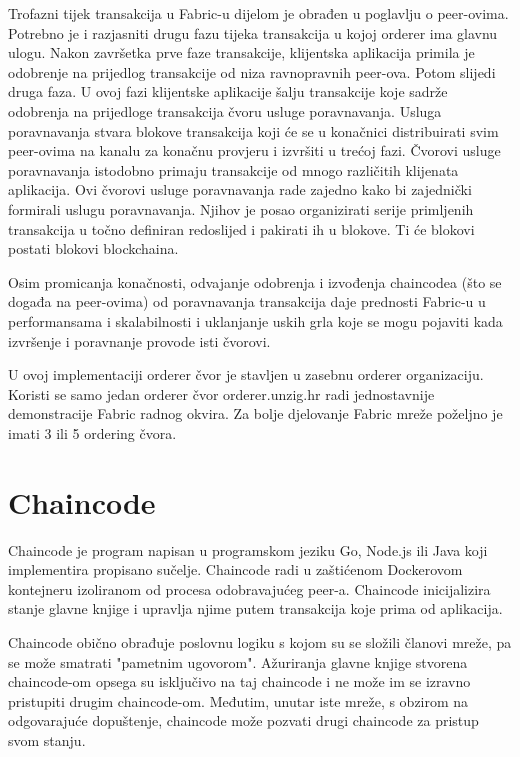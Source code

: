 \documentclass[times, utf8, diplomski]{fer}
\begin{document}
Trofazni tijek transakcija u Fabric-u dijelom je obrađen u poglavlju o peer-ovima.  Potrebno je i razjasniti drugu fazu tijeka transakcija u kojoj orderer ima glavnu ulogu.  Nakon završetka prve faze transakcije, klijentska aplikacija primila je odobrenje na prijedlog transakcije od niza ravnopravnih peer-ova. Potom slijedi druga faza. U ovoj fazi klijentske aplikacije šalju transakcije koje sadrže odobrenja na prijedloge transakcija čvoru usluge poravnavanja. Usluga poravnavanja stvara blokove transakcija koji će se u konačnici distribuirati svim peer-ovima na kanalu za konačnu provjeru i izvršiti u trećoj fazi. Čvorovi usluge poravnavanja istodobno primaju transakcije od mnogo različitih klijenata aplikacija. Ovi čvorovi usluge poravnavanja rade zajedno kako bi zajednički formirali uslugu poravnavanja. Njihov je posao organizirati serije primljenih transakcija u točno definiran redoslijed i pakirati ih u blokove. Ti će blokovi postati blokovi blockchaina.

Osim promicanja konačnosti,  odvajanje odobrenja i izvođenja chaincodea (što se događa na peer-ovima) od poravnavanja transakcija daje prednosti Fabric-u u performansama i skalabilnosti i uklanjanje uskih grla koje se mogu pojaviti kada izvršenje i poravnanje provode isti čvorovi.

U ovoj implementaciji orderer čvor je stavljen u zasebnu orderer organizaciju.  Koristi se samo jedan orderer čvor orderer.unzig.hr radi jednostavnije demonstracije Fabric radnog okvira. Za bolje djelovanje Fabric mreže poželjno je imati 3 ili 5 ordering čvora. 


\section{Chaincode}
Chaincode je program napisan u programskom jeziku Go,  Node.js ili Java koji implementira propisano sučelje.  Chaincode radi u zaštićenom Dockerovom kontejneru izoliranom od procesa odobravajućeg peer-a.  Chaincode inicijalizira stanje glavne knjige i upravlja njime putem transakcija koje prima od aplikacija. \cite{Fabric}


Chaincode obično obrađuje poslovnu logiku s kojom su se složili članovi mreže, pa se može smatrati "pametnim ugovorom". Ažuriranja glavne knjige stvorena chaincode-om opsega su isključivo na taj chaincode i ne može im se izravno pristupiti drugim chaincode-om. Međutim, unutar iste mreže, s obzirom na odgovarajuće dopuštenje,  chaincode može pozvati drugi chaincode za pristup svom stanju.
\end{document}
